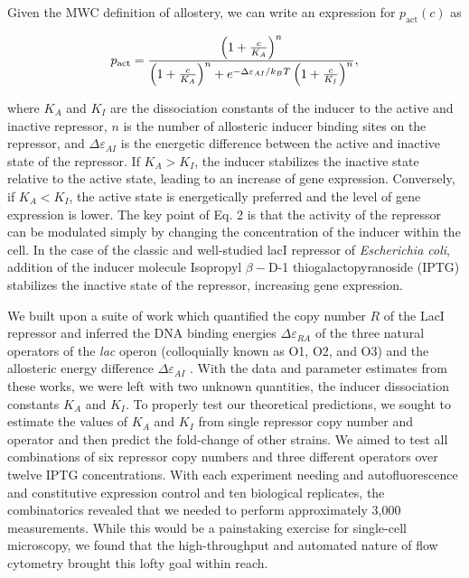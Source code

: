 \documentclass[letterpaper, 10pt]{article}
\begin{document}
Given the MWC definition of allostery, we can write an expression
for $p_\mathrm{act}(c)$ as

\begin{equation}
  p_\mathrm{act} = {\left(1 + {c \over K_A}\right)^n \over \left(1 + {c \over
  K_A}\right)^n + e^{-\Delta\varepsilon_{AI} / k_BT}\left(1 + {c \over
  K_I}\right)^n},
\label{eq:p_act}
\end{equation}

where $K_A$ and $K_I$ are the dissociation constants of the inducer to the
active and inactive repressor, $n$ is the number of allosteric
inducer binding sites on the repressor, and $\Delta\varepsilon_{AI}$ is the
energetic difference between the active and inactive state of the repressor. If
$K_A > K_I$, the inducer stabilizes the inactive state relative to the active state,
leading to an increase of gene expression.
Conversely, if $K_A < K_I$, the active state is energetically preferred and the
level of gene expression is lower. The key point of Eq. 2 is that
the activity of the repressor can be modulated simply by changing the
concentration of the inducer within the cell. In the case of the classic
and well-studied lacI repressor of \textit{Escherichia coli}, addition of the inducer molecule
Isopropyl $\beta-$D-1 thiogalactopyranoside (IPTG) stabilizes the inactive state of the
repressor, increasing gene expression.

We built upon a suite of work which quantified the copy number $R$ of the LacI
repressor and inferred the DNA binding energies $\Delta\varepsilon_{RA}$ of the
three natural operators of the \textit{lac} operon (colloquially known as O1,
O2, and O3) and the allosteric energy difference $\Delta\varepsilon_{AI}$
\cite{Garcia2011, Brewster2014}. With the data and parameter estimates from
these works, we were left with two unknown quantities, the inducer dissociation
constants $K_A$ and $K_I$. To properly test our theoretical predictions, we
sought to estimate the values of $K_A$ and $K_I$ from single repressor copy
number and operator and then predict the fold-change of other strains. We aimed
to test all combinations of six repressor copy numbers and three different operators
over twelve IPTG concentrations. With each experiment needing and
autofluorescence and constitutive expression control
and ten biological replicates, the combinatorics revealed that we
needed to perform approximately 3,000 measurements. While this would be a
painstaking exercise for single-cell microscopy, we found that the
high-throughput and automated nature of flow cytometry brought this lofty goal
within reach.
\end{document}
